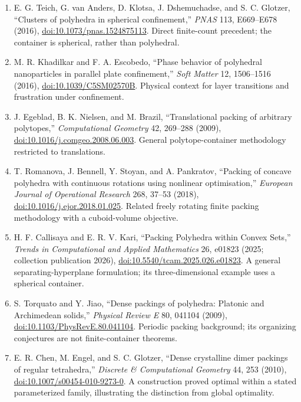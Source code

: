 \documentclass[11pt,a4paper]{article}
\begin{document}
\begin{enumerate}
\item E. G. Teich, G. van Anders, D. Klotsa, J. Dshemuchadse, and S. C. Glotzer, ``Clusters of polyhedra in spherical confinement,'' \emph{PNAS} 113, E669--E678 (2016), \href{https://doi.org/10.1073/pnas.1524875113}{doi:10.1073/pnas.1524875113}. Direct finite-count precedent; the container is spherical, rather than polyhedral.
\item M. R. Khadilkar and F. A. Escobedo, ``Phase behavior of polyhedral nanoparticles in parallel plate confinement,'' \emph{Soft Matter} 12, 1506--1516 (2016), \href{https://doi.org/10.1039/C5SM02570B}{doi:10.1039/C5SM02570B}. Physical context for layer transitions and frustration under confinement.
\item J. Egeblad, B. K. Nielsen, and M. Brazil, ``Translational packing of arbitrary polytopes,'' \emph{Computational Geometry} 42, 269--288 (2009), \href{https://doi.org/10.1016/j.comgeo.2008.06.003}{doi:10.1016/j.comgeo.2008.06.003}. General polytope-container methodology restricted to translations.
\item T. Romanova, J. Bennell, Y. Stoyan, and A. Pankratov, ``Packing of concave polyhedra with continuous rotations using nonlinear optimisation,'' \emph{European Journal of Operational Research} 268, 37--53 (2018), \href{https://doi.org/10.1016/j.ejor.2018.01.025}{doi:10.1016/j.ejor.2018.01.025}. Related freely rotating finite packing methodology with a cuboid-volume objective.
\item H. F. Callisaya and E. R. V. Kari, ``Packing Polyhedra within Convex Sets,'' \emph{Trends in Computational and Applied Mathematics} 26, e01823 (2025; collection publication 2026), \href{https://doi.org/10.5540/tcam.2025.026.e01823}{doi:10.5540/tcam.2025.026.e01823}. A general separating-hyperplane formulation; its three-dimensional example uses a spherical container.
\item S. Torquato and Y. Jiao, ``Dense packings of polyhedra: Platonic and Archimedean solids,'' \emph{Physical Review E} 80, 041104 (2009), \href{https://doi.org/10.1103/PhysRevE.80.041104}{doi:10.1103/PhysRevE.80.041104}. Periodic packing background; its organizing conjectures are not finite-container theorems.
\item E. R. Chen, M. Engel, and S. C. Glotzer, ``Dense crystalline dimer packings of regular tetrahedra,'' \emph{Discrete \& Computational Geometry} 44, 253 (2010), \href{https://doi.org/10.1007/s00454-010-9273-0}{doi:10.1007/s00454-010-9273-0}. A construction proved optimal within a stated parameterized family, illustrating the distinction from global optimality.

\end{enumerate}
\end{document}
